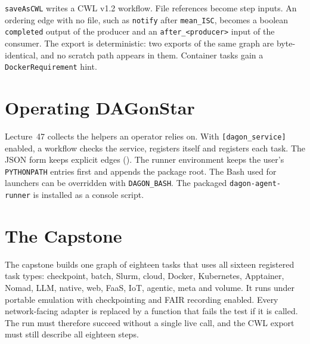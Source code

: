 \texttt{saveAsCWL} writes a CWL v1.2 workflow. File references become step
inputs. An ordering edge with no file, such as \texttt{notify} after
\texttt{mean\_ISC}, becomes a boolean \texttt{completed} output of the
producer and an \texttt{after\_<producer>} input of the consumer. The export
is deterministic: two exports of the same graph are byte-identical, and no
scratch path appears in them. Container tasks gain a
\texttt{DockerRequirement} hint.





\section{Operating DAGonStar}

Lecture~47 collects the helpers an operator relies on. With
\texttt{[dagon\_service]} enabled, a workflow checks the service, registers
itself and registers each task. The JSON form keeps explicit edges
(). The runner environment keeps the user's
\texttt{PYTHONPATH} entries first and appends the package root. The Bash used
for launchers can be overridden with \texttt{DAGON\_BASH}. The packaged
\texttt{dagon-agent-runner} is installed as a console script.



\section{The Capstone}

The capstone builds one graph of eighteen tasks that uses all sixteen
registered task types: checkpoint, batch, Slurm, cloud, Docker, Kubernetes,
Apptainer, Nomad, LLM, native, web, FaaS, IoT, agentic, meta and volume. It runs under
portable emulation with checkpointing and FAIR recording enabled. Every
network-facing adapter is replaced by a function that fails the test if it is
called. The run must therefore succeed without a single live call, and the
CWL export must still describe all eighteen steps.



